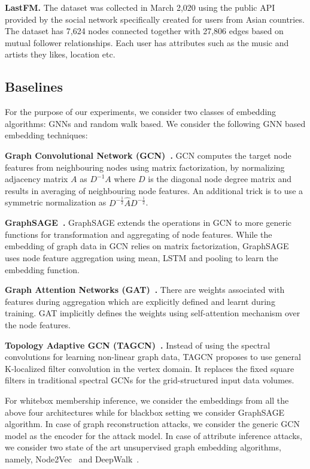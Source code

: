 \noindent\textbf{LastFM.} The dataset was collected in March 2,020 using the public API provided by the social network specifically created for users from Asian countries.
The dataset has 7,624 nodes connected together with 27,806 edges based on mutual follower relationships.
Each user has attributes such as the music and artists they likes, location etc.


\subsection{Baselines}

\noindent For the purpose of our experiments, we consider two classes of embedding algorithms: GNNs and random walk based.
We consider the following GNN based embedding techniques:

\noindent\textbf{Graph Convolutional Network (GCN)~\cite{Kipf2016tc}.} GCN computes the target node features from neighbouring nodes using matrix factorization, by normalizing adjacency matrix $A$ as $D^{-1}A$ where $D$ is the diagonal node degree matrix and results in averaging of neighbouring node features.
An additional trick is to use a symmetric normalization as $D^{-\frac{1}{2}}\hat{A}D^{-\frac{1}{2}}$.

\noindent\textbf{GraphSAGE~\cite{NIPS20176703}.} GraphSAGE extends the operations in GCN to more generic functions for transformation and aggregating of node features.
While the embedding of graph data in GCN relies on matrix factorization, GraphSAGE uses node feature aggregation using mean, LSTM and pooling to learn the embedding function.

\noindent\textbf{Graph Attention Networks (GAT)~\cite{velickovic2018graph}.} There are weights associated with features during aggregation which are explicitly defined and learnt during training.
GAT implicitly defines the weights using self-attention mechanism over the node features.

\noindent\textbf{Topology Adaptive GCN (TAGCN)~\cite{du2018topology}.} Instead of using the spectral convolutions for learning non-linear graph data, TAGCN proposes to use general K-localized filter convolution in the vertex domain.
It replaces the fixed square filters in traditional spectral GCNs for the grid-structured input data volumes.

\noindent For whitebox membership inference, we consider the embeddings from all the above four architectures while for blackbox setting we consider GraphSAGE algorithm.
In case of graph reconstruction attacks, we consider the generic GCN model as the encoder for the attack model.
In case of attribute inference attacks, we consider two state of the art unsupervised graph embedding algorithms, namely, Node2Vec~\cite{node2vec} and DeepWalk~\cite{deepwalk}.

